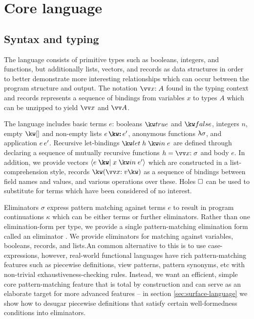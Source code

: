 \section{Core language}
\label{sec:core-language}

\subsection{Syntax and typing}


The language consists of primitive types such as booleans, integers, and functions, but additionally lists, vectors, and records as data structures in order to better demonstrate more interesting relationships which can occur between the program structure and output. The notation $\seq{\bind{x}{A}}$ found in the typing context and records represents a sequence of bindings from variables $x$ to types $A$ which can be unzipped to yield $\seq{x}$ and $\seq{A}$.



The language includes basic terms $e$: booleans $\exTrue$ and $\exFalse$, integers $n$, empty $\exNil$ and non-empty lists $\exCons{e}{e'}$, anonymous functions $\uplambda{\sigma}$, and application ${e}\,{e'}$. Recursive let-bindings $\exLetRecMutual{h}{e}$ are defined through declaring a sequence of mutually recursive functions $h = \seq{\bind{x}{\sigma}}$ and body $e$. In addition, we provide vectors $\exVec{e}{x}{e'}$ which are constructed in a list-comprehension style, records $\exRec{\vec{\bind{x}{v}}}$ as a sequence of bindings between field names and values, and various operations over these. Holes $\square$ can be used to substitute for terms which have been considered of no interest.

Eliminators $\sigma$ express pattern matching against terms $e$ to result in program continuations $\kappa$ which can be either terms or further eliminators. Rather than one elimination-form per type, we provide a single pattern-matching elimination form called an eliminator \cite{hinze00}. We provide eliminators for matching against variables, booleans, records, and lists.An common alternative to this is to use case-expressions, however, real-world functional languages have rich pattern-matching features such as piecewise definitions, view patterns, pattern synonyms, etc with non-trivial exhaustiveness-checking rules. Instead, we want an efficient, simple core pattern-matching feature that is total by construction and can serve as an elaborate target for more advanced features -- in section \ref{sec:surface-language} we show how to desugar piecewise definitions that satisfy certain well-formedness conditions into eliminators. 


